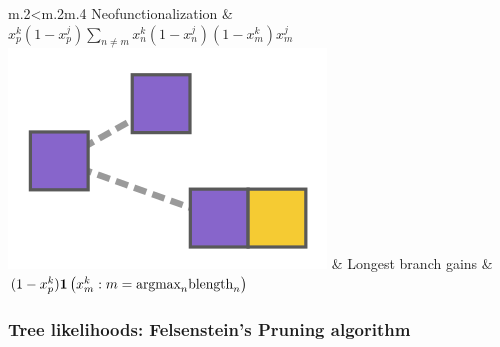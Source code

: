 \documentclass[aspectratio=169, 9pt]{beamer}
\begin{document}
\begin{frame}
\begin{table}
\begin{tabular}{m{.2\linewidth}<\centering m{.2\linewidth}m{.4\linewidth}}
		Neofunctionalization & $x_p^k(1 - x_p^j)\sum_{n\neq m}x_n^k(1-x_n^j)(1-x_m^k)x_m^j$ \\
	\includegraphics[width=\fwidth]{fig/term-longest.png} & %
		Longest branch gains & $(1-x_p^k){\boldsymbol{1}\left( x_m^k : m=\mbox{argmax}_n\mbox{blength}_n \right)}$ \\
	\bottomrule
	\end{tabular}
	\caption{Example of sufficient statistics for evolutionary transitions.}
	\end{table}
\end{frame}


\begin{frame}[c]
\frametitle{Tree likelihoods: Felsenstein's Pruning algorithm}
\begin{center}
\end{center}
\vfill\hfill{}
\end{frame}
\end{document}
